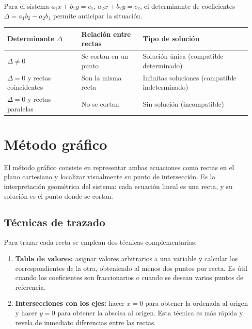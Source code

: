 \documentclass[12pt]{article}
\begin{document}
Para el sistema \(a_1x+b_1y=c_1\), \(a_2x+b_2y=c_2\), el determinante de coeficientes \(\Delta = a_1b_2-a_2b_1\) permite anticipar la situación.

\begin{center}
\begin{tabular}{p{3cm}p{5cm}p{5cm}}
\toprule
Determinante \(\Delta\) & Relación entre rectas & Tipo de solución \\
\midrule
\(\Delta \ne 0\) & Se cortan en un punto & Solución única (compatible determinado) \\
\(\Delta = 0\) y rectas coincidentes & Son la misma recta & Infinitas soluciones (compatible indeterminado) \\
\(\Delta = 0\) y rectas paralelas & No se cortan & Sin solución (incompatible) \\
\bottomrule
\end{tabular}
\end{center}

\section{Método gráfico}

El método gráfico consiste en representar ambas ecuaciones como rectas en el plano cartesiano y localizar visualmente su punto de intersección. Es la interpretación geométrica del sistema: cada ecuación lineal es una recta, y su solución es el punto donde se cortan.

\subsection{Técnicas de trazado}

Para trazar cada recta se emplean dos técnicas complementarias:

\begin{enumerate}[leftmargin=*, itemsep=0.3em]
  \item \textbf{Tabla de valores:} asignar valores arbitrarios a una variable y calcular los correspondientes de la otra, obteniendo al menos dos puntos por recta. Es útil cuando los coeficientes son fraccionarios o cuando se desean varios puntos de referencia.
  \item \textbf{Intersecciones con los ejes:} hacer \(x=0\) para obtener la ordenada al origen y hacer \(y=0\) para obtener la abscisa al origen. Esta técnica es más rápida y revela de inmediato diferencias entre las rectas.
\end{enumerate}
\end{document}
